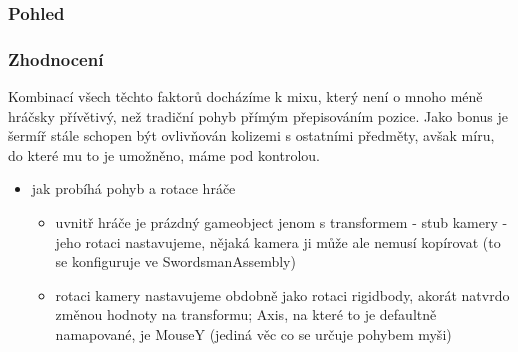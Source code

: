 \subsubsection*{Pohled}

\subsubsection*{Zhodnocení}

Kombinací všech těchto faktorů docházíme k mixu, který není o mnoho méně hráčsky přívětivý, než tradiční pohyb přímým přepisováním pozice. Jako bonus je šermíř stále schopen být ovlivňován kolizemi s ostatními předměty, avšak míru, do které mu to je umožněno, máme pod kontrolou.

\pagebreak 
\begin{itemize}
  \item jak probíhá pohyb a rotace hráče
    \begin{itemize}
      \item uvnitř hráče je prázdný gameobject jenom s transformem - stub kamery - jeho rotaci nastavujeme, nějaká kamera ji může ale nemusí kopírovat (to se konfiguruje ve SwordsmanAssembly)
      \item rotaci kamery nastavujeme obdobně jako rotaci rigidbody, akorát natvrdo změnou hodnoty na transformu; Axis, na které to je defaultně namapované, je MouseY (jediná věc co se určuje pohybem myši)

\end{itemize}
\end{itemize}
